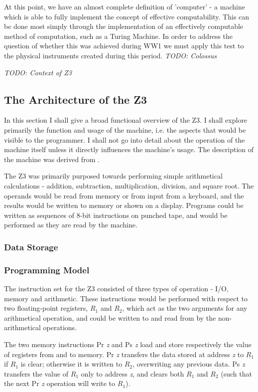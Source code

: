 \documentclass[Master.tex]{subfiles}
\begin{document}
At this point, we have an almost complete definition of 'computer' - a machine which is able to fully implement the concept of effective computability. This can be done most simply through the implementation of an effectively computable method of computation, such as a Turing Machine. In order to address the question of whether this was achieved during WW1 we must apply this test to the physical instruments created during this period.
\textit{TODO: Colossus}

\textit{TODO: Context of Z3}

\subsection{The Architecture of the Z3}

In this section I shall give a broad functional overview of the Z3. I shall explore primarily the function and usage of the machine, i.e. the aspects that would be visible to the programmer. I shall not go into detail about the operation of the machine itself unless it directly influences the machine's usage. The description of the machine was derived from \cite{rojas1997z3architecture}.

The Z3 was primarily purposed towards performing simple arithmetical calculations - addition, subtraction, multiplication, division, and square root. The operands would be read from memory or from input from a keyboard, and the results would be written to memory or shown on a display. Programs could be written as sequences of 8-bit instructions on punched tape, and would be performed as they are read by the machine.

\subsubsection{Data Storage}



\subsubsection{Programming Model}

The instruction set for the Z3 consisted of three types of operation - I/O, memory and arithmetic. These instructions would be performed with respect to two floating-point registers, $R_1$ and $R_2$, which act as the two arguments for any arithmetical operation, and could be written to and read from by the non-arithmetical operations. 

The two memory instructions Pr \textit{z} and Ps \textit{z} load and store respectively the value of registers from and to memory. Pr \textit{z} transfers the data stored at address \textit{z} to $R_1$ if $R_1$ is clear; otherwise it is written to $R_2$, overwriting any previous data. Ps \textit{z} transfers the value of $R_1$ only to address \textit{z}, and clears both $R_1$ and $R_2$ (such that the next Pr \textit{z} operation will write to $R_1$). 
\end{document}
